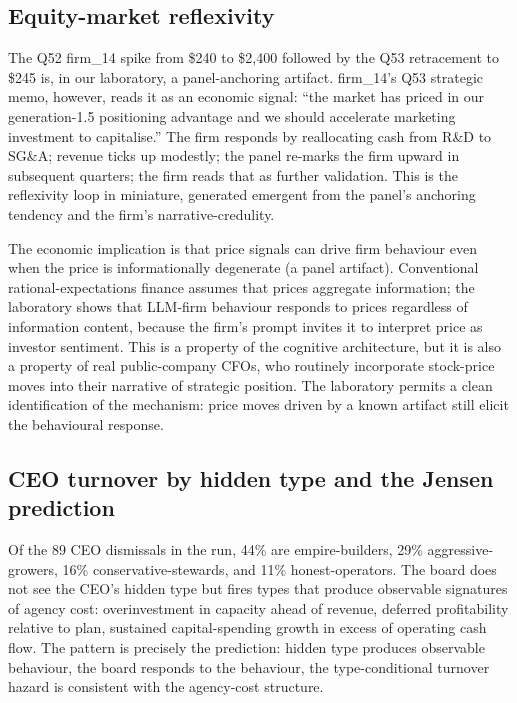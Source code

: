 \documentclass[11pt]{article}
\begin{document}
\subsection{Equity-market reflexivity}

The Q52 firm\_14 spike from \$240 to \$2{,}400 followed by the Q53
retracement to \$245 is, in our laboratory, a panel-anchoring
artifact. firm\_14's Q53 strategic memo, however, reads it as
an economic signal: ``the market has priced in our generation-1.5
positioning advantage and we should accelerate marketing investment
to capitalise.'' The firm responds by reallocating cash from R\&D to
SG\&A; revenue ticks up modestly; the panel re-marks the firm
upward in subsequent quarters; the firm reads that as further
validation. This is the \citet{soros1987alchemy} reflexivity loop
in miniature, generated emergent from the panel's anchoring
tendency and the firm's narrative-credulity.

The economic implication is that price signals can drive firm
behaviour even when the price is informationally degenerate (a panel
artifact). Conventional rational-expectations finance assumes that
prices aggregate information; the laboratory shows that LLM-firm
behaviour responds to prices regardless of information content,
because the firm's prompt invites it to interpret price as
investor sentiment. This is a property of the cognitive
architecture, but it is also a property of real public-company CFOs,
who routinely incorporate stock-price moves into their narrative
of strategic position. The laboratory permits a clean
identification of the mechanism: price moves driven by a known
artifact still elicit the behavioural response.

\subsection{CEO turnover by hidden type and the Jensen prediction}

Of the 89 CEO dismissals in the run, 44\% are empire-builders, 29\%
aggressive-growers, 16\% conservative-stewards, and 11\%
honest-operators. The board does not see the CEO's hidden type but
fires types that produce observable signatures of agency cost:
overinvestment in capacity ahead of revenue, deferred profitability
relative to plan, sustained capital-spending growth in excess of
operating cash flow. The pattern is precisely the
\citet{jensen1986agency} prediction: hidden type produces observable
behaviour, the board responds to the behaviour, the type-conditional
turnover hazard is consistent with the agency-cost structure.
\end{document}
